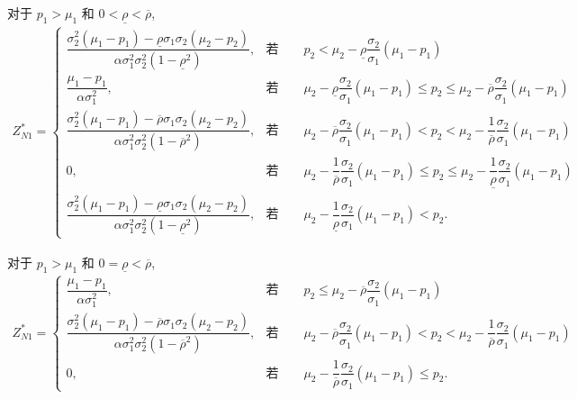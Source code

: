 \documentclass[10.0pt]{article}
\begin{document}
对于 $ p_1 > \mu_1 $ 和 $ 0 < \underline{\rho} < \overline{\rho} $,
{\footnotesize \begin{eqnarray}
Z_{N 1}^* = \left\{ \begin{matrix}
\dfrac{\sigma_2^2 (\mu_1 - p_1) - \underline{\rho} \sigma_1 \sigma_2 (\mu_2 - p_2)}{\alpha \sigma_1^2 \sigma_2^2 (1 - \underline{\rho}^2)}, & \text{若} \qquad p_2 < \mu_2 - \underline{\rho} \dfrac{\sigma_2}{\sigma_1} (\mu_1 - p_1) \\
\dfrac{\mu_1 - p_1}{\alpha \sigma_1^2}, & \text{若} \qquad \mu_2 - \underline{\rho} \dfrac{\sigma_2}{\sigma_1} (\mu_1 - p_1) \leqslant p_2 \leqslant \mu_2 - \overline{\rho} \dfrac{\sigma_2}{\sigma_1} (\mu_1 - p_1) \\
\dfrac{\sigma_2^2 (\mu_1 - p_1) - \overline{\rho} \sigma_1 \sigma_2 (\mu_2 - p_2)}{\alpha \sigma_1^2 \sigma_2^2 (1 - \overline{\rho}^2)}, & \text{若} \qquad \mu_2 - \overline{\rho} \dfrac{\sigma_2}{\sigma_1} (\mu_1 - p_1) < p_2 < \mu_2 - \dfrac1{\overline{\rho}} \dfrac{\sigma_2}{\sigma_1} (\mu_1 - p_1) \\
0, & \text{若} \qquad \mu_2 - \dfrac1{\overline{\rho}} \dfrac{\sigma_2}{\sigma_1} (\mu_1 - p_1) \leqslant p_2 \leqslant \mu_2 - \dfrac1{\underline{\rho}} \dfrac{\sigma_2}{\sigma_1} (\mu_1 - p_1) \\
\dfrac{\sigma_2^2 (\mu_1 - p_1) - \underline{\rho} \sigma_1 \sigma_2 (\mu_2 - p_2)}{\alpha \sigma_1^2 \sigma_2^2 (1 - \underline{\rho}^2)}, & \text{若} \qquad \mu_2 - \dfrac1{\underline{\rho}} \dfrac{\sigma_2}{\sigma_1} (\mu_1 - p_1) < p_2.
\end{matrix} \right.
\end{eqnarray}}

对于 $ p_1 > \mu_1 $ 和 $ 0 = \underline{\rho} < \overline{\rho} $,
{\footnotesize \begin{eqnarray}
Z_{N 1}^* = \left\{ \begin{matrix}
\dfrac{\mu_1 - p_1}{\alpha \sigma_1^2}, & \text{若} \qquad p_2 \leqslant \mu_2 - \overline{\rho} \dfrac{\sigma_2}{\sigma_1} (\mu_1 - p_1) \\
\dfrac{\sigma_2^2 (\mu_1 - p_1) - \overline{\rho} \sigma_1 \sigma_2 (\mu_2 - p_2)}{\alpha \sigma_1^2 \sigma_2^2 (1 - \overline{\rho}^2)}, & \text{若} \qquad \mu_2 - \overline{\rho} \dfrac{\sigma_2}{\sigma_1} (\mu_1 - p_1) < p_2 < \mu_2 - \dfrac1{\overline{\rho}} \dfrac{\sigma_2}{\sigma_1} (\mu_1 - p_1) \\
0, & \text{若} \qquad \mu_2 - \dfrac1{\overline{\rho}} \dfrac{\sigma_2}{\sigma_1} (\mu_1 - p_1) \leqslant p_2.
\end{matrix} \right.
\end{eqnarray}}
\end{document}
